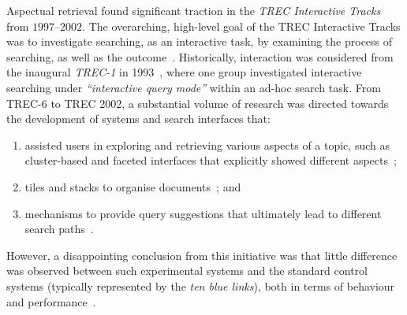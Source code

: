 
Aspectual retrieval found significant traction in the \textit{TREC Interactive Tracks} from $1997$--$2002$. The overarching, high-level goal of the TREC Interactive Tracks was to investigate searching, as an interactive task, by examining the process of searching, as well as the outcome~\cite{over2001trec}. Historically, interaction was considered from the inaugural \emph{TREC-1} in 1993~\cite{harman1993trec1}, where one group investigated interactive searching under \emph{``interactive query mode''} within an ad-hoc search task. From TREC-6 to TREC 2002, a substantial volume of research was directed towards the development of systems and search interfaces that: 
\begin{enumerate}
\item assisted users in exploring and retrieving various aspects of a topic, such as cluster-based and faceted interfaces that explicitly showed different aspects~\cite{villa2009aspect_interface,mcdonald1998interactive}; 
\item tiles and stacks to organise documents~\cite{hearst1995tilebars,hearst1997texttiling,harper2006piling,iwata2012tilediversified}; and 
\item mechanisms to provide query suggestions that ultimately lead to different search paths~\cite{umemoto2016scentbar,kato2012query_suggestion}. 
\end{enumerate}
However, a disappointing conclusion from this initiative was that little difference was observed between such experimental systems and the standard control systems (typically represented by the \emph{ten blue links}), both in terms of behaviour and performance~\cite{voorhees05trec}.

